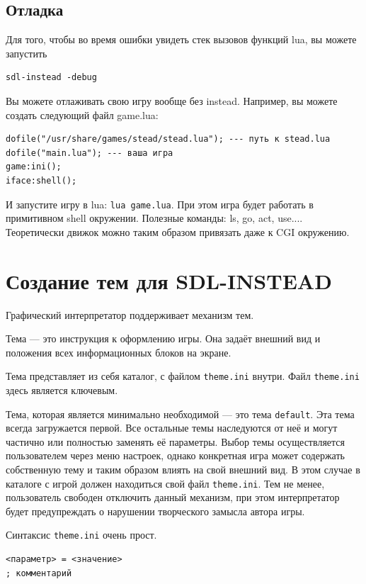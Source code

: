 \documentclass[a4paper,12pt]{article}
\begin{document}
\subsection{Отладка}
Для того, чтобы во время ошибки увидеть стек вызовов функций lua, вы можете запустить

\begin{verbatim}
sdl-instead -debug
\end{verbatim}

Вы можете отлаживать свою игру вообще без instead. Например, вы можете создать следующий файл game.lua:

\begin{verbatim}
dofile("/usr/share/games/stead/stead.lua"); --- путь к stead.lua
dofile("main.lua"); --- ваша игра
game:ini();
iface:shell();
\end{verbatim}

И запустите игру в lua: \verb/lua game.lua/. При этом игра будет работать в примитивном shell окружении. Полезные команды: ls, go, act, use.... Теоретически движок можно таким образом привязать даже к CGI окружению.

\section{Создание тем для SDL-INSTEAD}

Графический интерпретатор поддерживает механизм тем.

Тема --- это инструкция к оформлению игры. Она задаёт внешний вид и положения всех информационных блоков на экране.

Тема представляет из себя каталог, с файлом \verb/theme.ini/ внутри. Файл \verb/theme.ini/ здесь является ключевым.

Тема, которая является минимально необходимой --- это тема \verb/default/. Эта тема всегда загружается первой. Все остальные темы наследуются от неё и могут частично или полностью заменять её параметры. Выбор темы осуществляется пользователем через меню настроек, однако конкретная игра может содержать собственную тему и таким образом влиять на свой внешний вид. В этом случае в каталоге с игрой должен находиться свой файл \verb/theme.ini/. Тем не менее, пользователь свободен отключить данный механизм, при этом интерпретатор будет предупреждать о нарушении творческого замысла автора игры.

Синтаксис \verb/theme.ini/ очень прост.

\begin{verbatim}
<параметр> = <значение>
; комментарий
\end{verbatim}
\end{document}
